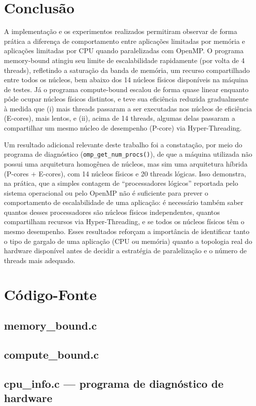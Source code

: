\documentclass[a4paper,12pt]{article}
\begin{document}
\section{Conclusão}

A implementação e os experimentos realizados permitiram observar de forma
prática a diferença de comportamento entre aplicações limitadas por memória e
aplicações limitadas por CPU quando paralelizadas com OpenMP. O programa
memory-bound atingiu seu limite de escalabilidade rapidamente (por volta de 4
threads), refletindo a saturação da banda de memória, um recurso
compartilhado entre todos os núcleos, bem abaixo dos 14 núcleos físicos
disponíveis na máquina de testes. Já o programa compute-bound escalou de
forma quase linear enquanto pôde ocupar núcleos físicos distintos, e teve sua
eficiência reduzida gradualmente à medida que (i) mais threads passaram a
ser executadas nos núcleos de eficiência (E-cores), mais lentos, e (ii),
acima de 14 threads, algumas delas passaram a compartilhar um mesmo núcleo
de desempenho (P-core) via Hyper-Threading.
 
Um resultado adicional relevante deste trabalho foi a constatação, por meio
do programa de diagnóstico (\texttt{omp\_get\_num\_procs()}), de que a
máquina utilizada não possui uma arquitetura homogênea de núcleos, mas sim
uma arquitetura híbrida (P-cores + E-cores), com 14 núcleos físicos e 20
threads lógicas. Isso demonstra, na prática, que a simples contagem de
``processadores lógicos'' reportada pelo sistema operacional ou pelo OpenMP
não é suficiente para prever o comportamento de escalabilidade de uma
aplicação: é necessário também saber quantos desses processadores são
núcleos físicos independentes, quantos compartilham recursos via
Hyper-Threading, e se todos os núcleos físicos têm o mesmo desempenho.
Esses resultados reforçam a importância de identificar tanto o tipo de
gargalo de uma aplicação (CPU ou memória) quanto a topologia real do
hardware disponível antes de decidir a estratégia de paralelização e o
número de threads mais adequado.

\newpage

\appendix
\section{Código-Fonte}

\subsection{memory\_bound.c}


\subsection{compute\_bound.c}


\subsection{cpu\_info.c --- programa de diagnóstico de hardware}
\label{sec:cpu_info}

\end{document}
